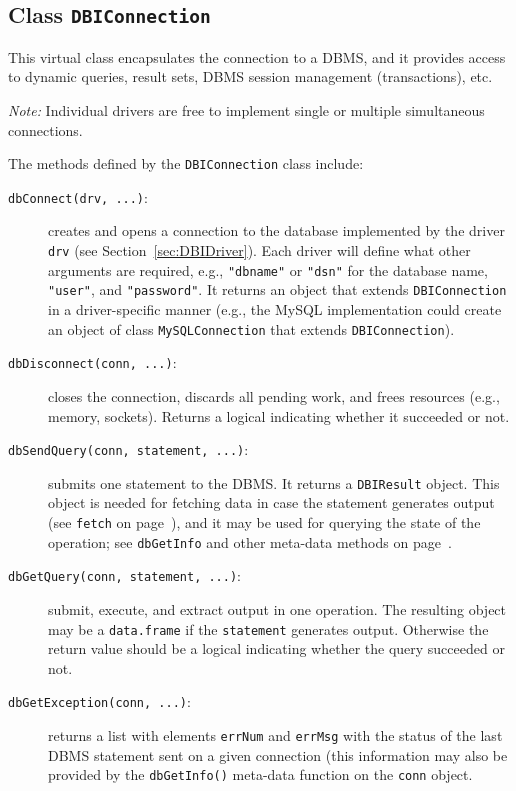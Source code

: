 \documentclass[graphics,times,psfig,dvips,hyper]{article}
\newcommand{\sfun}[1]{\mbox{\tt #1()}}  %
\newcommand{\sobj}[1]{\mbox{\tt #1}}    %
\newcommand{\sclass}[1]{\mbox{\tt #1}}  %
\newcommand{\smethod}[1]{\mbox{\tt #1}} %
\begin{document}
\subsection{Class \sclass{DBIConnection}}\label{sec:DBIConnection}
This virtual class encapsulates the connection to a DBMS, and
it provides access to dynamic queries, result sets, DBMS session
management (transactions), etc.

\emph{Note:} Individual drivers are free to implement single or
multiple simultaneous connections.

The methods defined by the \sclass{DBIConnection} class include:
\begin{description}
\item[\smethod{dbConnect(drv, ...)}:]\label{meth:dbConnect}
  creates and opens a connection to the database implemented by the
  driver \sobj{drv} (see Section~\ref{sec:DBIDriver}).  Each driver will
  define what other arguments are required, e.g., \sobj{"dbname"} or
  \sobj{"dsn"} for the database name, \sobj{"user"}, and \sobj{"password"}.
  It returns an object that extends \sclass{DBIConnection} in a
  driver-specific manner (e.g., the MySQL implementation could
  create an object of class \sclass{MySQLConnection} that extends 
  \sclass{DBIConnection}).

\item[\smethod{dbDisconnect(conn, ...)}:]
  closes the connection, discards all pending work, and frees
  resources (e.g., memory, sockets).  Returns a logical indicating
  whether it succeeded or not.

\item[\smethod{dbSendQuery(conn, statement, ...)}:]
  submits one statement to the DBMS.  It returns a \sclass{DBIResult}
  object. This object is needed for fetching data in case
  the statement generates output (see \smethod{fetch} on
  page~\pageref{meth:fetch}), and it may be used for querying the
  state of the operation; see \smethod{dbGetInfo} and other 
  meta-data methods on page~\pageref{meth:res-others}.

\item[\smethod{dbGetQuery(conn, statement, ...)}:]
  submit, execute, and extract output in one operation.
  The resulting object may be a \sclass{data.frame} if
  the \sobj{statement} generates output.  Otherwise the
  return value  should be a logical indicating whether
  the query succeeded or not.

\item[\smethod{dbGetException(conn, ...)}:]
  returns a list with elements \sobj{errNum} and \sobj{errMsg}
  with the status of the last DBMS statement sent on a given
  connection (this information may also be provided by the
  \sfun{dbGetInfo} meta-data function on the \sobj{conn} object.


\end{description}
\end{document}
